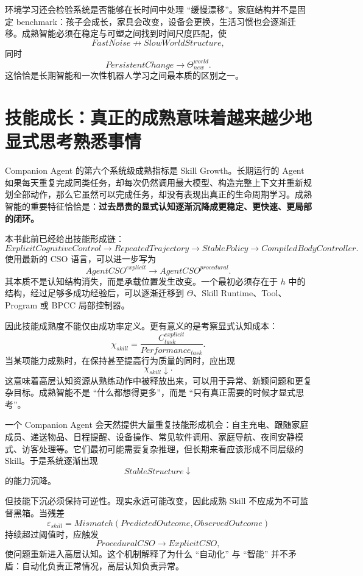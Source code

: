 环境学习还会检验系统是否能够在长时间中处理 ``缓慢漂移''。家庭结构并不是固定 benchmark：孩子会成长，家具会改变，设备会更换，生活习惯也会逐渐迁移。成熟智能必须在稳定与可塑之间找到时间尺度匹配，使
\[
FastNoise
\nrightarrow
SlowWorldStructure,
\]
同时
\[
PersistentChange
\rightarrow
\Theta^{world}_{new}.
\]
这恰恰是长期智能和一次性机器人学习之间最本质的区别之一。

\section{技能成长：真正的成熟意味着越来越少地显式思考熟悉事情}

Companion Agent 的第六个系统级成熟指标是 Skill Growth。长期运行的 Agent 如果每天重复完成同类任务，却每次仍然调用最大模型、构造完整上下文并重新规划全部动作，那么它虽然可以完成任务，却没有表现出真正的生命周期学习。成熟智能的重要特征恰恰是：\textbf{过去昂贵的显式认知逐渐沉降成更稳定、更快速、更局部的闭环。}

本书此前已经给出技能形成链：
\[
ExplicitCognitiveControl
\rightarrow
RepeatedTrajectory
\rightarrow
StablePolicy
\rightarrow
CompiledBodyController.
\]
使用最新的 CSO 语言，可以进一步写为
\[
AgentCSO^{explicit}
\rightarrow
AgentCSO^{procedural}.
\]
其本质不是认知结构消失，而是承载位置发生改变。一个最初必须存在于 $h$ 中的结构，经过足够多成功经验后，可以逐渐迁移到 $\Theta$、Skill Runtime、Tool、Program 或 BPCC 局部控制器。

因此技能成熟度不能仅由成功率定义。更有意义的是考察显式认知成本：
\[
\chi_{skill}
=
\frac{
C^{explicit}_{task}
}{
Performance_{task}
}.
\]
当某项能力成熟时，在保持甚至提高行为质量的同时，应出现
\[
\chi_{skill}\downarrow.
\]
这意味着高层认知资源从熟练动作中被释放出来，可以用于异常、新颖问题和更复杂目标。成熟智能不是 ``什么都想得更多''，而是 ``只有真正需要的时候才显式思考''。

一个 Companion Agent 会天然提供大量重复技能形成机会：自主充电、跟随家庭成员、递送物品、日程提醒、设备操作、常见软件调用、家庭导航、夜间安静模式、访客处理等。它们最初可能需要复杂推理，但长期来看应该形成不同层级的 Skill。于是系统逐渐出现
\[
StableStructure\downarrow
\]
的能力沉降。

但技能下沉必须保持可逆性。现实永远可能改变，因此成熟 Skill 不应成为不可监督黑箱。当残差
\[
\varepsilon_{skill}
=
Mismatch
\left(
PredictedOutcome,
ObservedOutcome
\right)
\]
持续超过阈值时，应触发
\[
ProceduralCSO
\rightarrow
ExplicitCSO,
\]
使问题重新进入高层认知。这个机制解释了为什么 ``自动化'' 与 ``智能'' 并不矛盾：自动化负责正常情况，高层认知负责异常。

